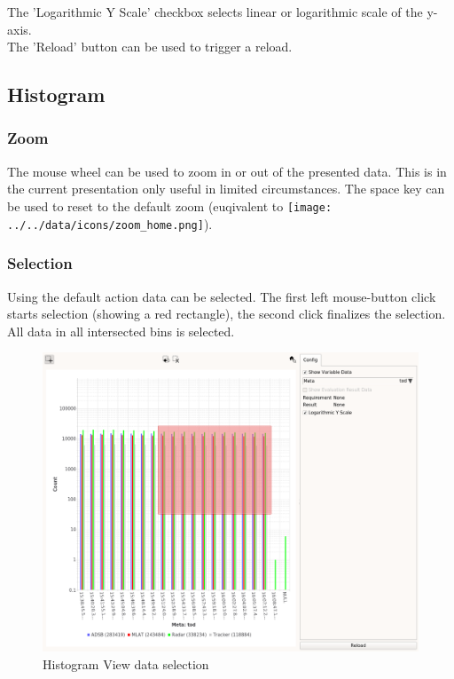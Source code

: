 The 'Logarithmic Y Scale' checkbox selects linear or logarithmic scale of the y-axis. \\

The 'Reload' button can be used to trigger a reload.

\subsection{Histogram}

\subsubsection{Zoom}

The mouse wheel can be used to zoom in or out of the presented data. This is in the current presentation only useful in limited circumstances. The space key can be used to reset to the default zoom (euqivalent to \texttt{[image: ../../data/icons/zoom\_home.png]}).

\subsubsection{Selection}

Using the default action data can be selected. The first left mouse-button click starts selection (showing a red rectangle), the second click finalizes the selection. All data in all intersected bins is selected.

\begin{figure}[H]
    \hspace*{-2cm}
    \includegraphics[width=18cm,frame]{../screenshots/histogram_select.png}
  \caption{Histogram View data selection}
\end{figure}

